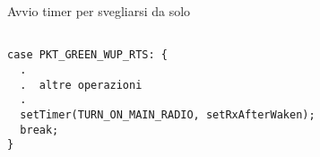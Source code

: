 \begin{listing}[h]
    \caption{Avvio timer per svegliarsi da solo}
    \label{code:afterRTS}
    \begin{verbatim}

case PKT_GREEN_WUP_RTS: {
  .
  .  altre operazioni 
  .
  setTimer(TURN_ON_MAIN_RADIO, setRxAfterWaken);
  break;
}

    \end{verbatim}
\end{listing}